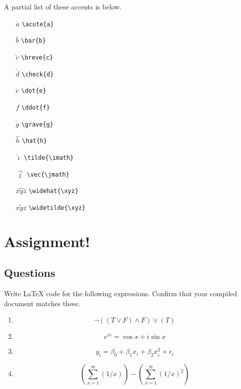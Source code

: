 A partial list of these accents is below.
\begin{multicols}{3}
\begin{itemize}
\item[$\acute{a}$] \texttt{\textbackslash acute\{a\}}
\item[$\bar{b}$] \texttt{\textbackslash bar\{b\}}
\item[$\breve{c}$] \texttt{\textbackslash breve\{c\}}
\item[$\check{d}$] \texttt{\textbackslash check\{d\}}
\item[$\dot{e}$] \texttt{\textbackslash dot\{e\}}
\item[$\ddot{f}$] \texttt{\textbackslash ddot\{f\}}
\item[$\grave{g}$] \texttt{\textbackslash grave\{g\}}
\item[$\hat{h}$] \texttt{\textbackslash hat\{h\}}
\item[$\tilde{\imath}$] \texttt{\textbackslash tilde\{\textbackslash imath\}}
\item[$\vec{\jmath}$] \texttt{\textbackslash vec\{\textbackslash jmath\}}
\item[$\widehat{xyz}$] \texttt{\textbackslash widehat\{\textbackslash xyz\}}
\item[$\widetilde{xyz}$] \texttt{\textbackslash widetilde\{\textbackslash xyz\}}

\end{itemize}
\end{multicols}

\section{Assignment!}

\subsection*{Questions}
Write \LaTeX{} code for the following expressions. Confirm that your
compiled document matches these.
\begin{enumerate}
\item
\[
\neg\left(\left(T \vee F\right) \wedge F\right) \vee \left( T \right)
\]

\item 
\[
e^{ix} = \cos x + i \sin x
\]

\item
\[
y_i = \beta_0 + \beta_1 x_i + \beta_2 x_i^2 + \epsilon_i
\]

\item
\[
\left(\sum_{x=1}^{\infty} (1/x) \right) - \left(\sum_{x=1}^{\infty}
  (1/x)^2 \right)
\]
\end{enumerate}

